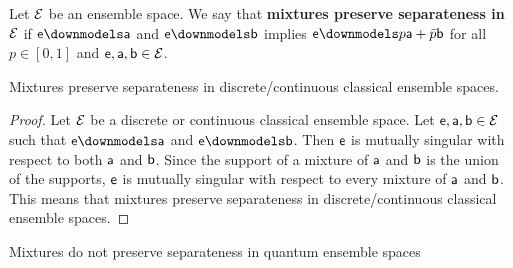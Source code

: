 \begin{mathSection}
\begin{defn}
	Let $\Ens$ be an ensemble space. We say that \textbf{mixtures preserve separateness in $\Ens$} if $\ens \separate \ens[a]$ and $\ens \separate \ens[b]$ implies $\ens \separate p \ens[a] + \bar{p} \ens[b]$ for all $p \in [0,1]$ and $\ens, \ens[a], \ens[b] \in \Ens$.
\end{defn}

\begin{prop}
	Mixtures preserve separateness in discrete/continuous classical ensemble spaces.
\end{prop}

\begin{proof}
	Let $\Ens$ be a discrete or continuous classical ensemble space. Let $\ens, \ens[a], \ens[b] \in \Ens$ such that $\ens \separate \ens[a]$ and $\ens \separate \ens[b]$. Then $\ens$ is mutually singular with respect to both $\ens[a]$ and $\ens[b]$. Since the support of a mixture of $\ens[a]$ and $\ens[b]$ is the union of the supports, $\ens$ is mutually singular with respect to every mixture of $\ens[a]$ and $\ens[b]$. This means that mixtures preserve separateness in discrete/continuous classical ensemble spaces.
\end{proof}

\begin{prop}
	Mixtures do not preserve separateness in quantum ensemble spaces
\end{prop}

\begin{figure}[H]
	\centering
\end{figure}


\end{mathSection}
